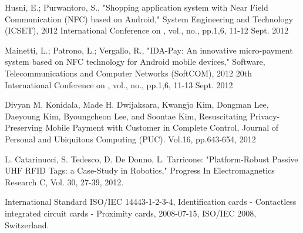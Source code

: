 \documentclass[a4paper]{article}
\begin{document}
\begin{thebibliography}{depth}

 Husni, E.; Purwantoro, S., "Shopping application system with Near Field Communication (NFC) based on Android," System Engineering and Technology (ICSET), 2012 International Conference on , vol., no., pp.1,6, 11-12 Sept. 2012
  
 Mainetti, L.; Patrono, L.; Vergallo, R., "IDA-Pay: An innovative micro-payment system based on NFC technology for Android mobile devices," Software, Telecommunications and Computer Networks (SoftCOM), 2012 20th International Conference on , vol., no., pp.1,6, 11-13 Sept. 2012

 Divyan M. Konidala, Made H. Dwijaksara, Kwangjo Kim, Dongman Lee, Daeyoung Kim, Byoungcheon Lee, and Soontae Kim, Resuscitating Privacy-Preserving Mobile Payment with Customer in Complete Control, Journal of Personal and Ubiquitous Computing (PUC). Vol.16, pp.643-654, 2012
  
 L. Catarinucci, S. Tedesco, D. De Donno, L. Tarricone: "Platform-Robust Passive UHF RFID Tags: a Case-Study in Robotics," Progress In Electromagnetics Research C, Vol. 30, 27-39, 2012.
  
 International Standard ISO/IEC 14443-1-2-3-4, Identification cards - Contactless integrated circuit cards - Proximity cards, 2008-07-15, ISO/IEC 2008, Switzerland.

\end{thebibliography}
\end{document}
